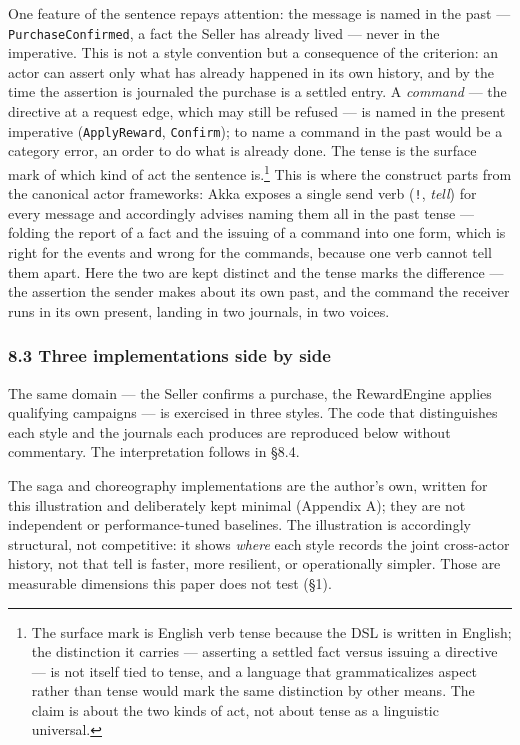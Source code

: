 \documentclass[
]{article}
\let\origtexttt\texttt%
\renewcommand{\texttt}[1]{\origtexttt{\seqsplit{#1}}}%
\let\texttt\origtexttt%
\begin{document}
One feature of the sentence repays attention: the message is named in
the past --- \texttt{PurchaseConfirmed}, a fact the Seller has already
lived --- never in the imperative. This is not a style convention but a
consequence of the criterion: an actor can assert only what has already
happened in its own history, and by the time the assertion is journaled
the purchase is a settled entry. A \emph{command} --- the directive at a
request edge, which may still be refused --- is named in the present
imperative (\texttt{ApplyReward}, \texttt{Confirm}); to name a command
in the past would be a category error, an order to do what is already
done. The tense is the surface mark of which kind of act the sentence
is.\footnote{The surface mark is English verb tense because the DSL is
  written in English; the distinction it carries --- asserting a settled
  fact versus issuing a directive --- is not itself tied to tense, and a
  language that grammaticalizes aspect rather than tense would mark the
  same distinction by other means. The claim is about the two kinds of
  act, not about tense as a linguistic universal.} This is where the
construct parts from the canonical actor frameworks: Akka exposes a
single send verb (\texttt{!}, \emph{tell}) for every message and
accordingly advises naming them all in the past tense --- folding the
report of a fact and the issuing of a command into one form, which is
right for the events and wrong for the commands, because one verb cannot
tell them apart. Here the two are kept distinct and the tense marks the
difference --- the assertion the sender makes about its own past, and
the command the receiver runs in its own present, landing in two
journals, in two voices.

\subsubsection{8.3 Three implementations side by
side}\label{three-implementations-side-by-side}

The same domain --- the Seller confirms a purchase, the RewardEngine
applies qualifying campaigns --- is exercised in three styles. The code
that distinguishes each style and the journals each produces are
reproduced below without commentary. The interpretation follows in §8.4.

The saga and choreography implementations are the author's own, written
for this illustration and deliberately kept minimal (Appendix A); they
are not independent or performance-tuned baselines. The illustration is
accordingly structural, not competitive: it shows \emph{where} each
style records the joint cross-actor history, not that tell is faster,
more resilient, or operationally simpler. Those are measurable
dimensions this paper does not test (§1).
\end{document}

